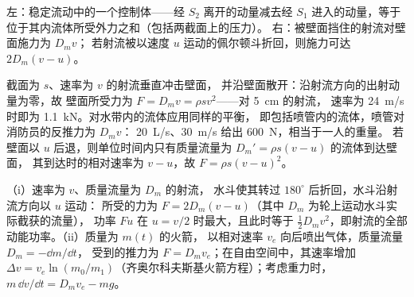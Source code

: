 \begin{omfigure}

{\small 左：稳定流动中的一个控制体——经
$S_2$ 离开的动量减去经 $S_1$ 进入的动量，等于
位于其内流体所受外力之和（包括两截面上的压力）。
右：被壁面挡住的射流对壁面施力为 $D_mv$；
若射流被以速度 $u$ 运动的佩尔顿斗折回，则施力可达
$2D_m(v - u)$。}
\end{omfigure}

\begin{example}\label{ex:b2:flow-balances:jet}
截面为 $s$、速率为 $v$ 的射流垂直冲击壁面，
并沿壁面散开：沿射流方向的出射动量为零，故
壁面所受力为 $F = D_mv = \rho sv^2$——对 \qty{5}{cm} 的射流，
速率为 \qty{24}{m/s} 时即为 \qty{1.1}{kN}。对水带内的流体应用同样的平衡，
即包括喷管内的流体，喷管对消防员的反推力为 $D_mv$：
\qty{20}{L/s}、\qty{30}{m/s} 给出 \qty{600}{N}，相当于一人的重量。
若壁面以 $u$ 后退，则单位时间内只有质量流量为 $D_m' = \rho s(v - u)$ 的流体到达壁面，
其到达时的相对速率为 $v - u$，故 $F = \rho s(v - u)^2$。
\end{example}

\begin{proposition}\label{prop:b2:flow-balances:pelton}
（i）速率为 $v$、质量流量为 $D_m$ 的射流，
水斗使其转过 $180^\circ$ 后折回，水斗沿射流方向以 $u$ 运动：
所受的力为 $F = 2D_m(v - u)$（其中 $D_m$ 为轮上运动水斗实际截获的流量），
功率 $Fu$ 在
$u = v/2$ 时最大，且此时等于 $\tfrac12D_mv^2$，即射流的全部
动能功率。（ii）质量为 $m(t)$ 的火箭，
以相对速率 $v_e$ 向后喷出气体，质量流量 $D_m = -\dd m/\dd t$，
受到的推力为 $F = D_mv_e$；在自由空间中，其速率增加
$\Delta v = v_e\ln(m_0/m_1)$（齐奥尔科夫斯基火箭方程）；考虑重力时，
$m\,\dd v/\dd t = D_mv_e - mg$。
\end{proposition}

